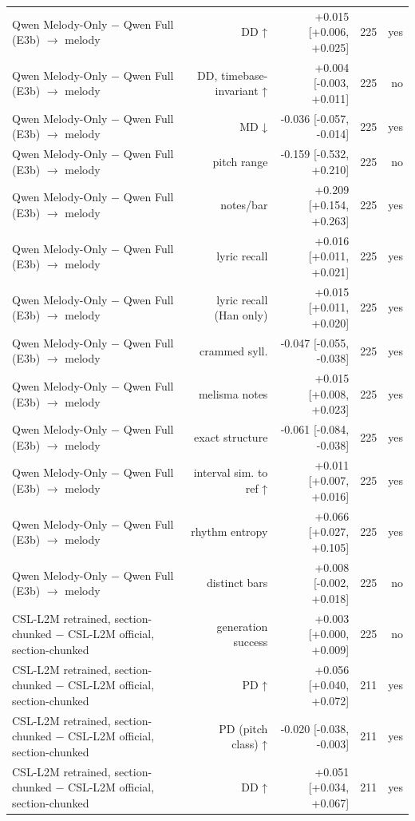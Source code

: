 \begin{table}[t]
\begin{tabular}{lrrrr}
Qwen Melody-Only $-$ Qwen Full (E3b) $\rightarrow$ melody & DD ↑ & +0.015 [+0.006, +0.025] & 225 & yes \\
Qwen Melody-Only $-$ Qwen Full (E3b) $\rightarrow$ melody & DD, timebase-invariant ↑ & +0.004 [-0.003, +0.011] & 225 & no \\
Qwen Melody-Only $-$ Qwen Full (E3b) $\rightarrow$ melody & MD ↓ & -0.036 [-0.057, -0.014] & 225 & yes \\
Qwen Melody-Only $-$ Qwen Full (E3b) $\rightarrow$ melody & pitch range & -0.159 [-0.532, +0.210] & 225 & no \\
Qwen Melody-Only $-$ Qwen Full (E3b) $\rightarrow$ melody & notes/bar & +0.209 [+0.154, +0.263] & 225 & yes \\
Qwen Melody-Only $-$ Qwen Full (E3b) $\rightarrow$ melody & lyric recall & +0.016 [+0.011, +0.021] & 225 & yes \\
Qwen Melody-Only $-$ Qwen Full (E3b) $\rightarrow$ melody & lyric recall (Han only) & +0.015 [+0.011, +0.020] & 225 & yes \\
Qwen Melody-Only $-$ Qwen Full (E3b) $\rightarrow$ melody & crammed syll. & -0.047 [-0.055, -0.038] & 225 & yes \\
Qwen Melody-Only $-$ Qwen Full (E3b) $\rightarrow$ melody & melisma notes & +0.015 [+0.008, +0.023] & 225 & yes \\
Qwen Melody-Only $-$ Qwen Full (E3b) $\rightarrow$ melody & exact structure & -0.061 [-0.084, -0.038] & 225 & yes \\
Qwen Melody-Only $-$ Qwen Full (E3b) $\rightarrow$ melody & interval sim. to ref ↑ & +0.011 [+0.007, +0.016] & 225 & yes \\
Qwen Melody-Only $-$ Qwen Full (E3b) $\rightarrow$ melody & rhythm entropy & +0.066 [+0.027, +0.105] & 225 & yes \\
Qwen Melody-Only $-$ Qwen Full (E3b) $\rightarrow$ melody & distinct bars & +0.008 [-0.002, +0.018] & 225 & no \\
CSL-L2M retrained, section-chunked $-$ CSL-L2M official, section-chunked & generation success & +0.003 [+0.000, +0.009] & 225 & no \\
CSL-L2M retrained, section-chunked $-$ CSL-L2M official, section-chunked & PD ↑ & +0.056 [+0.040, +0.072] & 211 & yes \\
CSL-L2M retrained, section-chunked $-$ CSL-L2M official, section-chunked & PD (pitch class) ↑ & -0.020 [-0.038, -0.003] & 211 & yes \\
CSL-L2M retrained, section-chunked $-$ CSL-L2M official, section-chunked & DD ↑ & +0.051 [+0.034, +0.067] & 211 & yes \\

\end{tabular}
\end{table}
